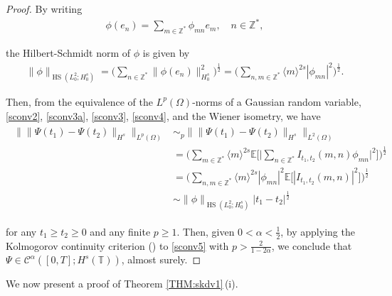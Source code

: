 \documentclass[letterpaper, 11pt,  reqno]{amsart}
\DeclareMathOperator{\HS}{HS}
\newcommand{\1}{\hspace{0.5mm}\text{I}\hspace{0.5mm}}
\newcommand{\noi}{\noindent}
\newcommand{\Z}{\mathbb{Z}}
\newcommand{\T}{\mathbb{T}}
\newcommand{\E}{\mathbb{E}}
\newcommand{\CC}{\mathcal{C}}
\newcommand{\al}{\alpha}
\renewcommand{\O}{\Omega}
\newcommand{\jb}[1]
{\langle #1 \rangle}
\newcommand{\N}{\mathbb{N}}
\numberwithin{equation}{section}
\numberwithin{theorem}{section}
\begin{document}
\begin{proof}

By writing 
\begin{align}
\phi(e_n) = \sum_{m \in \Z^*} \phi_{mn} e_m, \quad n \in \Z^*,
\label{sconv3a} 
\end{align}

\noi
the Hilbert-Schmidt norm of $\phi$ is given by 
\begin{align}
\| \phi\|_{\HS(L^2_0; H^s_0)}
= \bigg(\sum_{n \in \Z^*}\|\phi(e_n)\|_{H^s_0}^2\bigg)^\frac 12 
= \bigg(\sum_{n, m  \in \Z^*}\jb{m}^{2s} |\phi_{mn}|^2 \bigg)^\frac 12 .
\label{sconv4}
\end{align}

\noi
\noi
Then, from the equivalence of the $L^p(\O)$-norms 
of a Gaussian random variable, \eqref{sconv2}, 
\eqref{sconv3a}, 
\eqref{sconv3}, 
\eqref{sconv4}, 
and the Wiener isometry, we have
\begin{align}
\begin{aligned}
\big\| \|\Psi(t_1) - \Psi(t_2)\|_{H^s}\big\|_{L^p(\O)}
& \sim_p  \big\| \|\Psi(t_1) - \Psi(t_2)\|_{H^s}\big\|_{L^2(\O)}\\
& = \bigg(\sum_{m \in \Z^*} \jb{m}^{2s}
\E\bigg[\Big|\sum_{n \in \Z^*} I_{t_1, t_2}(m, n)\phi_{mn}\Big|^2\bigg]\bigg)^\frac 12 \\
& =  \bigg(\sum_{n, m \in \Z^*} \jb{m}^{2s}|\phi_{mn}|^2
\E\big[|I_{t_1, t_2}(m, n)|^2\big]\bigg)^\frac 12 \\
& \sim \|\phi\|_{\HS(L^2_0; H^s_0)}|t_1 - t_2|^\frac 12 
\end{aligned}
\label{sconv5}
\end{align}



\noi
for any $t_1 \ge t_2 \ge 0$ and any finite $p \ge 1$.
Then, given $0 < \al < \frac 12$, 
by applying
the Kolmogorov continuity criterion (\cite[Theorem 2.1]{Baldi})
to \eqref{sconv5}
with  $p > \frac{2}{1-2\al}$, 
 we conclude that 
 $\Psi \in \CC^\al([0, T]; H^s(\T))$, 
 almost surely.
 \end{proof}



We now present 
a proof of Theorem \ref{THM:skdv1}\,(i).
\end{document}
